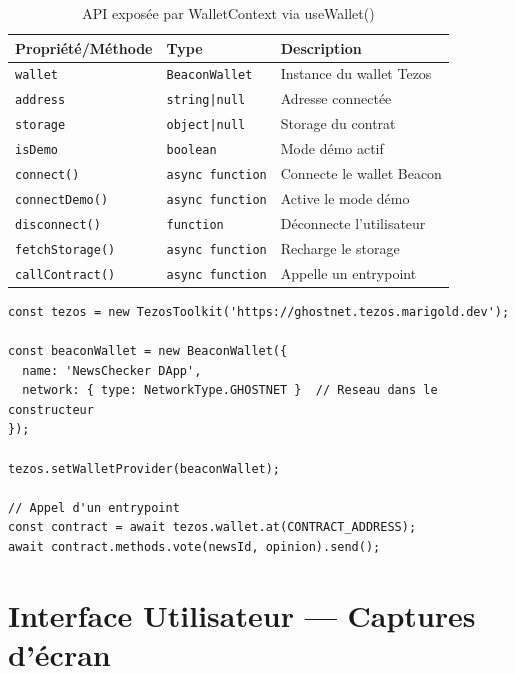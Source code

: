 \documentclass[12pt,a4paper]{article}
\begin{document}
\begin{table}[H]
\centering
\renewcommand{\arraystretch}{1.4}
\begin{tabular}{L{3.5cm} L{3.5cm} L{5cm}}
\toprule
{}
\textbf{Propriété/Méthode} & \textbf{Type} & \textbf{Description} \\
\midrule
\texttt{wallet}         & \texttt{BeaconWallet}    & Instance du wallet Tezos \\
\texttt{address}        & \texttt{string|null}     & Adresse connectée \\
\texttt{storage}        & \texttt{object|null}     & Storage du contrat \\
\texttt{isDemo}         & \texttt{boolean}         & Mode démo actif \\
\texttt{connect()}      & \texttt{async function}  & Connecte le wallet Beacon \\
\texttt{connectDemo()}  & \texttt{async function}  & Active le mode démo \\
\texttt{disconnect()}   & \texttt{function}        & Déconnecte l'utilisateur \\
\texttt{fetchStorage()} & \texttt{async function}  & Recharge le storage \\
\texttt{callContract()} & \texttt{async function}  & Appelle un entrypoint \\
\bottomrule
\end{tabular}
\caption{API exposée par WalletContext via useWallet()}
\end{table}

\begin{lstlisting}[language=JSX, caption={Initialisation TezosToolkit et BeaconWallet}]
const tezos = new TezosToolkit('https://ghostnet.tezos.marigold.dev');

const beaconWallet = new BeaconWallet({
  name: 'NewsChecker DApp',
  network: { type: NetworkType.GHOSTNET }  // Reseau dans le constructeur
});

tezos.setWalletProvider(beaconWallet);

// Appel d'un entrypoint
const contract = await tezos.wallet.at(CONTRACT_ADDRESS);
await contract.methods.vote(newsId, opinion).send();
\end{lstlisting}

\section{Interface Utilisateur --- Captures d'écran}
\end{document}
